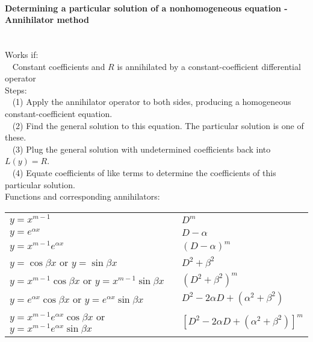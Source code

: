 \documentclass[10pt]{article}
\begin{document}
\paragraph{Determining a particular solution of a nonhomogeneous equation - Annihilator method}\ \\
Works if:\\ 
$\phantom{x}$ Constant coefficients and $R$ is annihilated by a constant-coefficient differential operator\\
Steps:\\
$\phantom{x}$ (1) Apply the annihilator operator to both sides, producing a homogeneous constant-coefficient equation.\\
$\phantom{x}$ (2) Find the general solution to this equation.  The particular solution is one of these.\\
$\phantom{x}$ (3) Plug the general solution with undetermined coefficients back into $L(y) = R$.\\
$\phantom{x}$ (4) Equate coefficients of like terms to determine the coefficients of this particular solution.\\
Functions and corresponding annihilators:\\
\begin{tabular}{ll}
$y = x^{m-1}$ & $D^m$\\
$y = e^{\alpha x}$ & $D - \alpha$\\
$y = x^{m-1}e^{\alpha x}$ & $(D - \alpha)^m$\\
$y = \cos \beta x$ or $y = \sin \beta x$ & $D^2 + \beta^2$\\
$y = x^{m-1} \cos \beta x$ or $y = x^{m-1} \sin \beta x$ & $(D^2 + \beta^2)^m$\\
$y = e^{\alpha x} \cos \beta x$ or $y = e^{\alpha x} \sin \beta x$ & $D^2 - 2 \alpha D + (\alpha^2 + \beta^2)$\\
$y = x^{m-1} e^{\alpha x} \cos \beta x$ or $y = x^{m-1} e^{\alpha x} \sin \beta x$ 
& $[D^2 - 2 \alpha D + (\alpha^2 + \beta^2)]^m$
\end{tabular}
\end{document}
